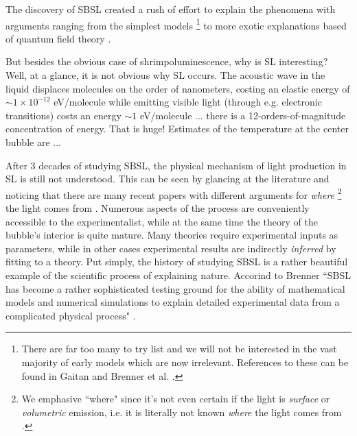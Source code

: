 \documentclass[rmp,aps,nofootinbib,superscriptaddress,floatfix]{revtex4-2}
\begin{document}
The discovery of SBSL created a rush of effort to explain the phenomena with arguments ranging from the simplest models \footnote{There are far too many to try list and we will not be interested in the vast majority of early models which are now irrelevant. References to these can be found in Gaitan \cite{gaitan1990experimental} and Brenner et al. \cite{brenner2002single}.} to more exotic explanations based of quantum field theory \cite{schwinger1993casimir,eberlein1996sonoluminescence,liberati2000sonoluminescence}.


But besides the obvious case of shrimpoluminescence, why is SL interesting? Well, at a glance, it is not obvious why SL occurs. The acoustic wave in the liquid displaces molecules on the order of nanometers, costing an elastic energy of  $\sim1\times 10^{-12}$ eV/molecule while emitting visible light (through e.g. electronic transitions) costs an energy $\sim1$ eV/molecule \cite{lohse2018bubble,crum1994sonoluminescence}... there is a 12-orders-of-magnitude concentration of energy. That is huge! Estimates of the temperature at the center bubble are ...






After 3 decades of studying SBSL, the physical mechanism of light production in SL is still not understood. This can be seen by glancing at the literature and noticing that there are many recent papers with different arguments for \emph{where} \footnote{We emphasive ``where" since it's not even certain if the light is \emph{surface} or \emph{volumetric} emission, i.e. it is literally not known \emph{where} the light comes from \cite{}.} the light comes from \cite{borisenok2020mechanisms,flannigan2013non,flannigan2012temperature,tatartchenko2017sonoluminescence}. Numerous aspects of the process are conveniently accessible to the experimentalist, while at the same time the theory of the bubble's interior is quite mature. Many theories require experimental inputs as parameters, while in other cases experimental results are indirectly \emph{inferred} by fitting to a theory. Put simply, the history of studying SBSL is a rather beautiful example of the scientific process of explaining nature. Accorind to Brenner ``SBSL has become a rather sophisticated testing ground for the ability of mathematical models and numerical simulations to explain detailed experimental data from a complicated physical process" \cite{brenner2002single}.
\end{document}
